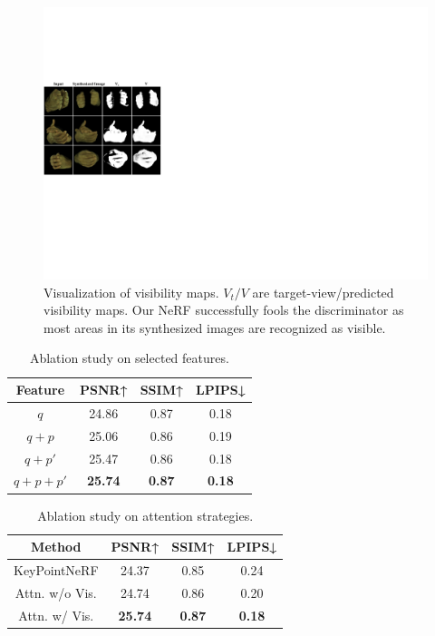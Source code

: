 \documentclass[letterpaper]{article} %
\begin{document}
\begin{figure}[t]
  \centering
  \includegraphics[width=1.0\hsize]{figures/vis_dis.pdf}
  \caption{Visualization of visibility maps. $V_t /V$ are target-view/predicted visibility maps. Our NeRF successfully fools the discriminator as most areas in its synthesized images are recognized as visible.}
  \label{fig:vis_dis}
\end{figure}


\begin{table}[t]
    \caption{Ablation study on selected features.}
    \label{tab:feats}
    \centering
    \begin{tabular}{cccc}
        \toprule
        Feature     & PSNR↑    & SSIM↑    & LPIPS↓     \\
        \midrule
        $q$ & 24.86 & 0.87 & 0.18 \\
        $q + p$ & 25.06 & 0.86 & 0.19 \\
        $q + p'$ & 25.47 & 0.86  & 0.18   \\
        $q + p + p'$ & \textbf{25.74} & \textbf{0.87}  & \textbf{0.18}     \\
        \bottomrule
    \end{tabular}
\end{table}

\begin{table}[t]
    \caption{Ablation study on attention strategies.}
    \label{tab:attn}
    \centering
    \begin{tabular}{cccc}
    \toprule
        Method     & PSNR↑    & SSIM↑    & LPIPS↓     \\
        \midrule
        KeyPointNeRF & 24.37 & 0.85 & 0.24 \\ \hline
        Attn. w/o Vis. & 24.74 & 0.86 & 0.20 \\
        Attn. w/ Vis. & \textbf{25.74} & \textbf{0.87} & \textbf{0.18} \\
        \bottomrule
    \end{tabular}
\end{table}
\end{document}
